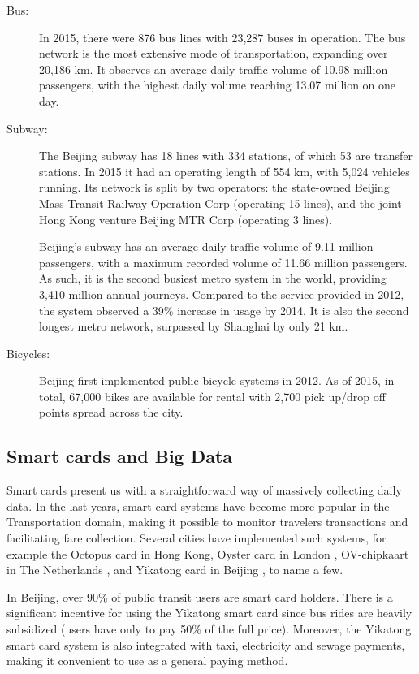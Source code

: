 \documentclass{article}
\begin{document}
\begin{description}
\item[Bus:] In 2015, there were 876 bus lines with 23,287 buses in operation. The bus network is the most extensive mode of transportation, expanding over 20,186 km. It observes an average daily traffic volume of 10.98 million passengers, with the highest daily volume reaching 13.07 million on one day. \cite{beijing2016annual}

\item[Subway:] The Beijing subway has 18 lines with 334 stations, of which 53 are transfer stations. In 2015 it had an operating length of 554 km, with 5,024 vehicles running. \cite{beijing2016annual} Its network is split by two operators: the state-owned Beijing Mass Transit Railway Operation Corp (operating 15 lines), and the joint Hong Kong venture Beijing MTR Corp (operating 3 lines).

Beijing's subway has an average daily traffic volume of 9.11 million passengers, with a maximum recorded volume of 11.66 million passengers. As such, it is the second busiest metro system in the world, providing 3,410 million annual journeys. Compared to the service provided in 2012, the system observed a 39\% increase in usage by 2014. It is also the second longest metro network, surpassed by Shanghai by only 21 km.  \cite{uitp2015world} 

\item[Bicycles:] Beijing first implemented public bicycle systems in 2012. As of 2015, in total, 67,000 bikes are available for rental with 2,700 pick up/drop off points spread across the city. \cite{beijing2016annual}
\end{description}


\subsection{Smart cards and Big Data}
Smart cards present us with a straightforward way of massively collecting daily data. In the last years, smart card systems have become more popular in the Transportation domain, making it possible to monitor travelers transactions and facilitating fare collection. Several cities have implemented such systems, for example the Octopus card in Hong Kong\cite{chau2003octopus}, Oyster card in London \cite{blythe2004improving}, OV-chipkaart in The Netherlands \cite{de2008analysis}, and Yikatong card in Beijing \cite{chan2010tactical}, to name a few.

In Beijing, over 90\% of public transit users are smart card holders. There is a significant incentive for using the Yikatong smart card since bus rides are heavily subsidized (users have only to pay 50\% of the full price)\cite{ma2017understanding}. Moreover, the Yikatong smart card system is also integrated with taxi, electricity and sewage payments, making it convenient to use as a general paying method.
\end{document}
